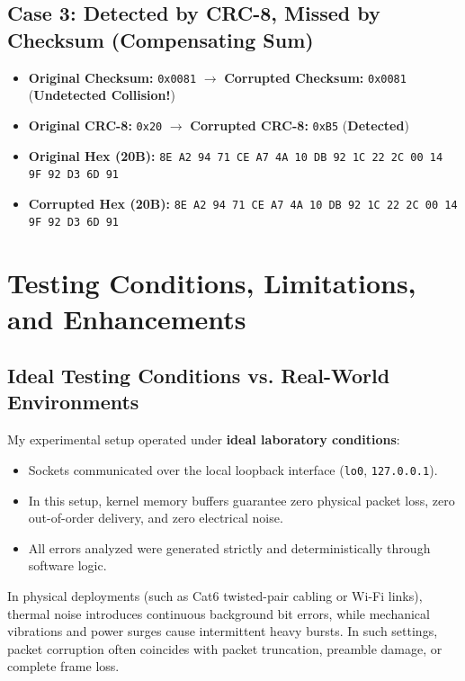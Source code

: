 \documentclass[12pt,a4paper]{article}
\begin{document}
\subsection{Case 3: Detected by CRC-8, Missed by Checksum (Compensating Sum)}
\begin{itemize}[leftmargin=*]
    \item \textbf{Original Checksum:} \texttt{0x0081} $\longrightarrow$ \textbf{Corrupted Checksum:} \texttt{0x0081} (\textbf{Undetected Collision!})
    \item \textbf{Original CRC-8:} \texttt{0x20} $\longrightarrow$ \textbf{Corrupted CRC-8:} \texttt{0xB5} (\textbf{Detected})
    \item \textbf{Original Hex (20B):} \texttt{8E A2 94 71 CE A7 4A 10 DB 92 1C 22 2C 00 14 9F 92 D3 6D 91}
    \item \textbf{Corrupted Hex (20B):} \texttt{8E A2 94 71 CE A7 4A 10 DB 92 1C 22 2C 00 14 9F 92 D3 6D 91}
\end{itemize}

\section{Testing Conditions, Limitations, and Enhancements}

\subsection{Ideal Testing Conditions vs. Real-World Environments}
My experimental setup operated under \textbf{ideal laboratory conditions}:
\begin{itemize}[leftmargin=*]
    \item Sockets communicated over the local loopback interface (\texttt{lo0}, \texttt{127.0.0.1}).
    \item In this setup, kernel memory buffers guarantee zero physical packet loss, zero out-of-order delivery, and zero electrical noise.
    \item All errors analyzed were generated strictly and deterministically through software logic.
\end{itemize}

In physical deployments (such as Cat6 twisted-pair cabling or Wi-Fi links), thermal noise introduces continuous background bit errors, while mechanical vibrations and power surges cause intermittent heavy bursts. In such settings, packet corruption often coincides with packet truncation, preamble damage, or complete frame loss.
\end{document}
